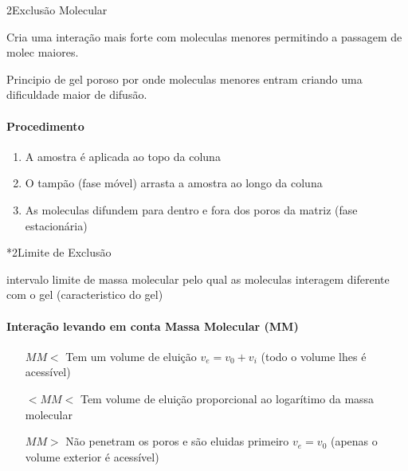\documentclass[\mainfilename]{subfiles}
\begin{document}
\begin{sectionBox}2{Exclusão Molecular}

    Cria uma interação mais forte com moleculas menores permitindo a passagem de molec maiores.

    Principio de gel poroso por onde moleculas menores entram criando uma dificuldade maior de difusão.
    
    \paragraph{Procedimento}
    \begin{enumerate}
        \item A amostra é aplicada ao topo da coluna
        \item O tampão (fase móvel) arrasta a amostra ao longo da coluna
        \item As moleculas difundem para dentro e fora dos poros da matriz (fase estacionária)
    \end{enumerate}

    \begin{sectionBox}*2{Limite de Exclusão}
        
        intervalo limite de massa molecular pelo qual as moleculas interagem diferente com o gel (caracteristico do gel)

        \paragraph{Interação levando em conta Massa Molecular (MM)}
        \begin{itemize}[left=3em]
            \item[\(MM<\)] Tem um volume de eluição \(v_e = v_0 + v_i\) (todo o volume lhes é acessível)
            \item[\(<MM<\)] Tem volume de eluição proporcional ao logarítimo da massa molecular
            \item[\(MM>\)] Não penetram os poros e são eluidas primeiro \(v_e = v_0\) (apenas o volume exterior é acessível)
        \end{itemize}
        
    \end{sectionBox}
    
\end{sectionBox}
\end{document}

